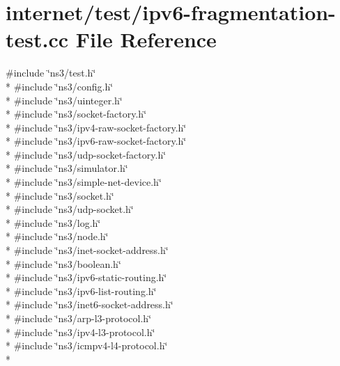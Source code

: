 \hypertarget{ipv6-fragmentation-test_8cc}{}\section{internet/test/ipv6-\/fragmentation-\/test.cc File Reference}
\label{ipv6-fragmentation-test_8cc}
{\ttfamily \#include \char`\"{}ns3/test.\+h\char`\"{}}\\*
{\ttfamily \#include \char`\"{}ns3/config.\+h\char`\"{}}\\*
{\ttfamily \#include \char`\"{}ns3/uinteger.\+h\char`\"{}}\\*
{\ttfamily \#include \char`\"{}ns3/socket-\/factory.\+h\char`\"{}}\\*
{\ttfamily \#include \char`\"{}ns3/ipv4-\/raw-\/socket-\/factory.\+h\char`\"{}}\\*
{\ttfamily \#include \char`\"{}ns3/ipv6-\/raw-\/socket-\/factory.\+h\char`\"{}}\\*
{\ttfamily \#include \char`\"{}ns3/udp-\/socket-\/factory.\+h\char`\"{}}\\*
{\ttfamily \#include \char`\"{}ns3/simulator.\+h\char`\"{}}\\*
{\ttfamily \#include \char`\"{}ns3/simple-\/net-\/device.\+h\char`\"{}}\\*
{\ttfamily \#include \char`\"{}ns3/socket.\+h\char`\"{}}\\*
{\ttfamily \#include \char`\"{}ns3/udp-\/socket.\+h\char`\"{}}\\*
{\ttfamily \#include \char`\"{}ns3/log.\+h\char`\"{}}\\*
{\ttfamily \#include \char`\"{}ns3/node.\+h\char`\"{}}\\*
{\ttfamily \#include \char`\"{}ns3/inet-\/socket-\/address.\+h\char`\"{}}\\*
{\ttfamily \#include \char`\"{}ns3/boolean.\+h\char`\"{}}\\*
{\ttfamily \#include \char`\"{}ns3/ipv6-\/static-\/routing.\+h\char`\"{}}\\*
{\ttfamily \#include \char`\"{}ns3/ipv6-\/list-\/routing.\+h\char`\"{}}\\*
{\ttfamily \#include \char`\"{}ns3/inet6-\/socket-\/address.\+h\char`\"{}}\\*
{\ttfamily \#include \char`\"{}ns3/arp-\/l3-\/protocol.\+h\char`\"{}}\\*
{\ttfamily \#include \char`\"{}ns3/ipv4-\/l3-\/protocol.\+h\char`\"{}}\\*
{\ttfamily \#include \char`\"{}ns3/icmpv4-\/l4-\/protocol.\+h\char`\"{}}\\*
